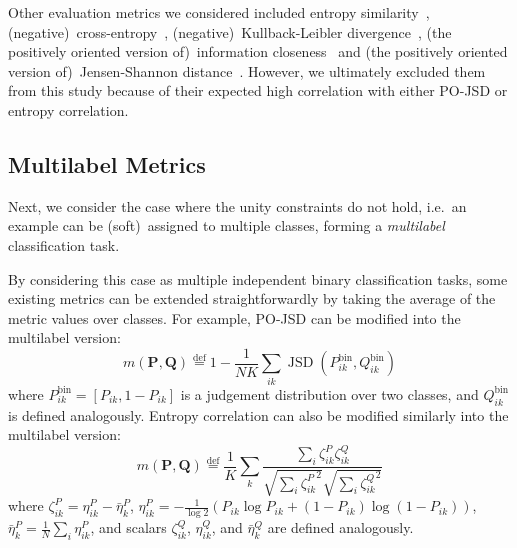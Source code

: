 \documentclass[shortpaper]{clv2025}
\newcommand{\pojsd}{PO-JSD\xspace}
\newcommand{\eqdef}{\overset{\mathrm{def}}{=}}  %
\DeclareMathOperator{\JSD}{JSD}
\begin{document}
Other evaluation metrics we considered included entropy similarity~\citep{uma2021},
(negative)~cross-entropy~\citep{peterson2019,pavlick2019},
(negative)~Kullback-Leibler divergence~\citep{nie2020}, (the positively oriented
version of)~information closeness~\citep{foody1996} and (the positively oriented
version of)~Jensen-Shannon distance~\citep{nie2020}. However, we ultimately excluded them
from this study because of their expected high correlation with either \pojsd
or entropy correlation.

\subsection{Multilabel Metrics}\label{sec:mullab-metrics}

Next, we consider the case where the unity constraints do not hold,
i.e.\ an example can be (soft)~assigned to multiple classes, forming a
\emph{multilabel} classification task.

By considering this case as multiple independent binary classification tasks,
some existing metrics can be extended straightforwardly by taking the average of
the metric values over classes. For example, \pojsd can be modified into the
multilabel version:
\begin{equation*}
  m(\mathbf{P},\mathbf{Q})\eqdef1-\frac{1}{NK}\sum_{ik}\JSD(P^{\text{bin}}_{ik},Q^{\text{bin}}_{ik})
\end{equation*}
where $P^{\text{bin}}_{ik}=[P_{ik},1-P_{ik}]$ is a judgement distribution over
two classes, and $Q^{\text{bin}}_{ik}$ is defined analogously.
Entropy correlation can also be modified similarly into the multilabel version:
\begin{equation*}
  m(\mathbf{P},\mathbf{Q})\eqdef\frac{1}{K}\sum_{k}\frac{\sum_i\zeta^P_{ik}\zeta^Q_{ik}}{\sqrt{\sum_i{\zeta^P_{ik}}^2}\sqrt{\sum_i{\zeta^Q_{ik}}^2}}
\end{equation*}
where $\zeta^P_{ik}=\eta^P_{ik}-\bar{\eta}^P_k$,
$\eta^P_{ik}=-\frac{1}{\log 2}\left( P_{ik}\log P_{ik}+(1-P_{ik})\log(1-P_{ik})
\right)$, $\bar{\eta}^P_k=\frac{1}{N}\sum_{i}\eta^P_{ik}$, and scalars $\zeta^Q_{ik}$,
$\eta^Q_{ik}$, and $\bar{\eta}^Q_k$ are defined analogously.
\end{document}
